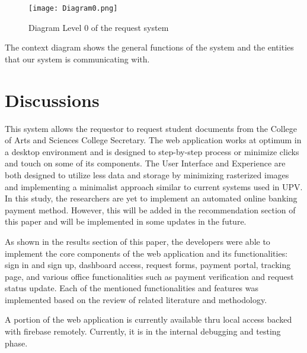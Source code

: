     \begin{figure}[h]
        \centering 
        \begin{minipage}[c]{0.7\linewidth}
            \centering
            \texttt{[image: Diagram0.png]}
            \caption{Diagram Level 0 of the request system}
            \label{fig:Diagram0}
        \end{minipage}
    \end{figure}
    
The context diagram shows the general functions of the system and the entities that our system is communicating with.



\section{Discussions}

This system allows the requestor to request student documents from the College of Arts and Sciences College Secretary. The web application works at optimum in a desktop environment and is designed to step-by-step process or minimize clicks and touch on some of its components. The User Interface and Experience are both designed to utilize less data and storage by minimizing rasterized images and implementing a minimalist approach similar to current systems used in UPV. In this study, the researchers are yet to implement an automated online banking payment method. However, this will be added in the recommendation section of this paper and will be implemented in some updates in the future.

As shown in the results section of this paper, the developers were able to implement the core components of the web application and its functionalities: sign in and sign up, dashboard access, request forms, payment portal, tracking page, and various office functionalities such as payment verification and request status update. Each of the mentioned functionalities and features was implemented based on the review of related literature and methodology. 

A portion of the web application is currently available thru local access backed with firebase remotely. Currently, it is in the internal debugging and testing phase.



